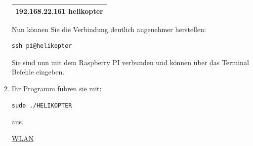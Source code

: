 \documentclass{article}
\begin{document}
\begin{enumerate}
\begin{center}
\begin{tabular}{|c|}
\hline
192.168.22.161 helikopter\\
\hline
\end{tabular}

\end{center}

Nun können Sie die Verbindung deutlich angenehmer herstellen:
\begin{verbatim}
ssh pi@helikopter
\end{verbatim}

Sie sind nun mit dem Raspberry PI verbunden und können über das Terminal Befehle eingeben.

\item Ihr Programm führen sie mit:
\begin{verbatim}
sudo ./HELIKOPTER
\end{verbatim}
aus.\\

\begin{center}
\underline{WLAN}
\end{center}
\end{enumerate}
\end{document}
